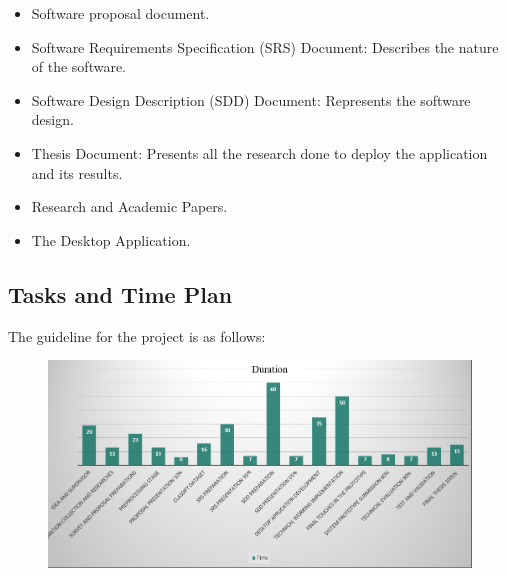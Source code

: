 \documentclass[12pt]{article}
\begin{document}
\begin{itemize}
    \item Software proposal document.
    \item Software Requirements Specification (SRS) Document: Describes the nature of the software.
    \item Software Design Description (SDD) Document: Represents the software design.
    \item  Thesis Document: Presents all the research done to deploy the application and its results.
    \item  Research and Academic Papers.
    \item The Desktop Application.
    
\end{itemize}

\subsection{Tasks and Time Plan}
The guideline for the project is as follows:

\begin{figure}[H]
    \centering
    \includegraphics[width=0.95\linewidth]{figures/Time chart.png}
    \label{fig:Time Plan Chart}
\end{figure}
\end{document}
